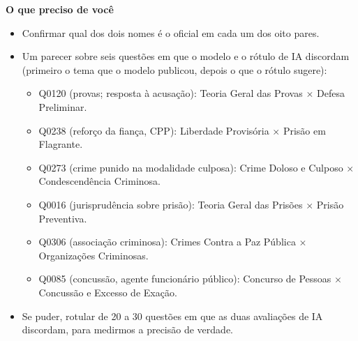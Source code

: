 \documentclass[11pt,a4paper]{article}
\newcommand{\bd}[1]{\textbf{#1}}
\begin{document}
\bd{O que preciso de você}
\begin{itemize}
\item Confirmar qual dos dois nomes é o oficial em cada um dos oito pares.
\item Um parecer sobre seis questões em que o modelo e o rótulo de IA discordam (primeiro o tema
      que o modelo publicou, depois o que o rótulo sugere):
      \begin{itemize}
      \item Q0120 (provas; resposta à acusação): Teoria Geral das Provas $\times$ Defesa Preliminar.
      \item Q0238 (reforço da fiança, CPP): Liberdade Provisória $\times$ Prisão em Flagrante.
      \item Q0273 (crime punido na modalidade culposa): Crime Doloso e Culposo $\times$
            Condescendência Criminosa.
      \item Q0016 (jurisprudência sobre prisão): Teoria Geral das Prisões $\times$ Prisão Preventiva.
      \item Q0306 (associação criminosa): Crimes Contra a Paz Pública $\times$ Organizações Criminosas.
      \item Q0085 (concussão, agente funcionário público): Concurso de Pessoas $\times$ Concussão e
            Excesso de Exação.
      \end{itemize}
\item Se puder, rotular de 20 a 30 questões em que as duas avaliações de IA discordam, para
      medirmos a precisão de verdade.
\end{itemize}
\end{document}
